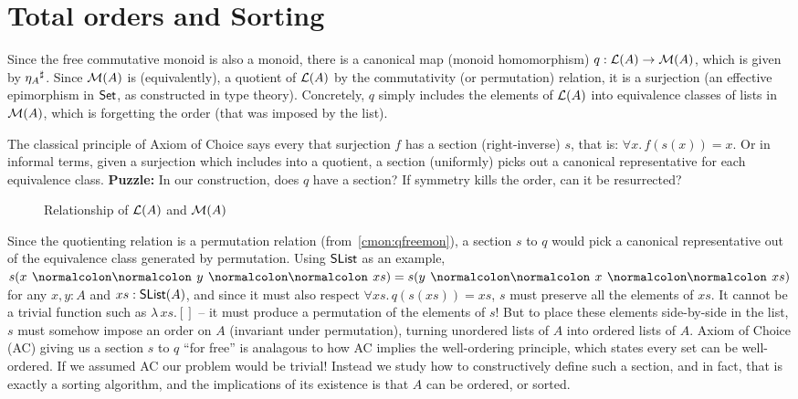 
\section{Total orders and Sorting}
\label{sec:sorting}

Since the free commutative monoid is also a monoid, there is a canonical map (monoid homomorphism)
$q : \mathcal{L}(A) \to \mathcal{M}(A)$, which is given by ${\eta_A}^{\sharp}$.
%
Since $\mathcal{M}(A)$ is (equivalently), a quotient of $\mathcal{L}(A)$ by the commutativity (or permutation) relation,
it is a surjection (an effective epimorphism in $\mathsf{Set}$, as constructed in type theory).
%
Concretely, $q$ simply includes the elements of $\mathcal{L}(A)$ into equivalence classes of lists in $\mathcal{M}(A)$,
which is forgetting the order (that was imposed by the list).

The classical principle of Axiom of Choice says every that surjection $f$ has a section (right-inverse) $s$, that is:
$\forall x.\, f(s(x)) = x$. Or in informal terms, given a surjection which includes into a quotient, a section
(uniformly) picks out a canonical representative for each equivalence class.
%
\textbf{Puzzle:} In our construction, does $q$ have a section? If symmetry kills the order, can it be resurrected?

\begin{figure}[H]
    \centering
    \caption{Relationship of $\mathcal{L}(A)$ and $\mathcal{M}(A)$}
    \label{fig:enter-label}
\end{figure}

Since the quotienting relation is a permutation relation (from~\cref{cmon:qfreemon}), a section $s$ to $q$ would pick a
canonical representative out of the equivalence class generated by permutation.
%
Using $\operatorname{\mathsf{SList}}$ as an example, $s(x \cons y \cons xs) = s(y \cons x \cons xs)$ for any $x, y : A$ and $xs : \operatorname{\mathsf{SList}}(A)$,
and since it must also respect $\forall xs.\,q(s(xs)) = xs$, $s$ must preserve all the elements of $xs$.
It cannot be a trivial function such as $\lambda\,xs. []$ -- it must produce a permutation of the elements of $s$!
%
But to place these elements side-by-side in the list, $s$ must somehow impose an order on $A$
(invariant under permutation), turning unordered lists of $A$ into ordered lists of $A$.
%
Axiom of Choice (AC) giving us a section $s$ to $q$ ``for free'' is analagous to how
AC implies the well-ordering principle, which states every set can be well-ordered.
%
If we assumed AC our problem would be trivial!
%
Instead we study how to constructively define such a section, and in fact, that is exactly a sorting algorithm,
and the implications of its existence is that $A$ can be ordered, or sorted.

